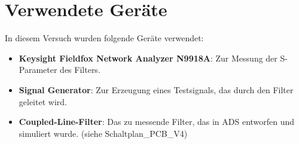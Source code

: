 
\section{Verwendete Geräte}
In diesem Versuch wurden folgende Geräte verwendet:
\begin{itemize}
    \item \textbf{Keysight Fieldfox Network Analyzer N9918A}: Zur Messung der S-Parameter des Filters.
    \item \textbf{Signal Generator}: Zur Erzeugung eines Testsignals, das durch den Filter geleitet wird.
    \item \textbf{Coupled-Line-Filter}: Das zu messende Filter, das in ADS entworfen und simuliert wurde. (siehe Schaltplan\_PCB\_V4)
\end{itemize}
\clearpage
